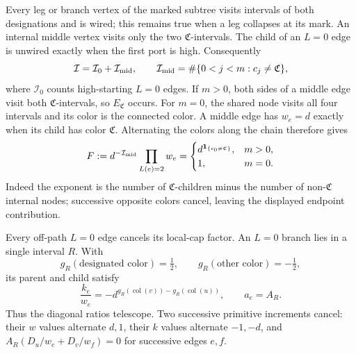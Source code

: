 Every leg or branch vertex of the marked subtree visits intervals of
both designations and
is wired; this remains true when a leg collapses at its mark.  An
internal middle vertex visits only the two $\mathfrak C$-intervals.
The child of an $L=0$ edge is unwired exactly when the first port is
high.  Consequently
\begin{equation}
 \mathcal I=\mathcal I_0+\mathcal I_{\rm mid},\qquad
 \mathcal I_{\rm mid}=\#\{0<j<m:c_j\ne\mathfrak C\},
 \label{obs:count-split}
\end{equation}
where $\mathcal I_0$ counts high-starting $L=0$ edges.  If $m>0$,
both sides of a middle edge visit both $\mathfrak C$-intervals, so
$E_{\mathfrak C}$ occurs.  For $m=0$, the shared node visits all four
intervals and its color is the connected color.  A middle edge has
$w_e=d$ exactly when its child has color $\mathfrak C$.  Alternating
the colors along the chain therefore gives
\begin{equation}
 F:=d^{-\mathcal I_{\rm mid}}\prod_{L(e)=2}w_e
 =\begin{cases}
 d^{\mathbf 1_{\{c_0\ne\mathfrak C\}}},&m>0,\\
 1,&m=0.
 \end{cases}
 \label{obs:middle-product}
\end{equation}
Indeed the exponent is the number of $\mathfrak C$-children minus
the number of non-$\mathfrak C$ internal nodes; successive opposite
colors cancel, leaving the displayed endpoint contribution.

Every off-path $L=0$ edge cancels its local-cap factor.  An $L=0$
branch lies in a single interval $R$.  With
\begin{equation}
 g_R(\text{designated color})=\tfrac12,\qquad
 g_R(\text{other color})=-\tfrac12,
 \label{obs:g}
\end{equation}
its parent and child satisfy
\begin{equation}
 \frac{k_e}{w_e}
 =-d^{g_R(\operatorname{col}(v))-g_R(\operatorname{col}(u))},
 \qquad a_e=A_R.
 \label{obs:tail}
\end{equation}
Thus the diagonal ratios telescope.  Two successive primitive
increments cancel: their $w$ values alternate $d,1$, their $k$ values
alternate $-1,-d$, and
$A_R(D_u/w_e+D_v/w_f)=0$ for successive edges $e,f$.

